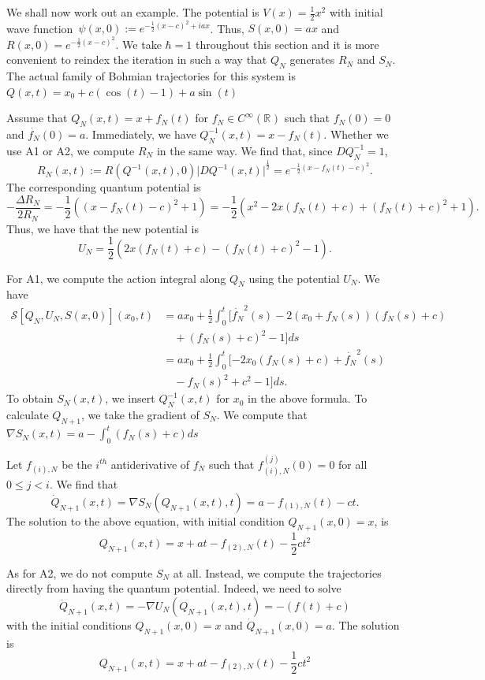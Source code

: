 \documentclass[11pt]{article}
\theoremstyle{remark}
\begin{document}
We shall now work out an  example. 
The potential is $V(x) = \frac{1}{2}x^2$ with initial wave function\
$\ensuremath{\psi} (x,0) \ensuremath{:=} e^{-\frac{1}{2}(x-c)^2+iax}$. Thus, $S(x,0) = ax$ and $R(x,0)
= e^{-\frac{1}{2}(x-c)^2}$. We take $\hbar =1$ throughout this section
and it is more convenient to reindex the iteration  in such a way  that $Q_N$
generates $R_N$ and $S_N$. The actual family of Bohmian trajectories for this
system is  $Q(x,t) = x_0 + c(\cos(t)-1) + a \sin(t) $


Assume that $Q_N(x,t) = x + f_N(t)$ for $f_N \in \ensuremath{C^{\infty}}(\ensuremath{\mathbb{R}^{}})$ such that
$f_N(0) =0$ and $\dot{f_N}(0) = a$. Immediately, we have $Q^{-1}_N (x,t) =
x -f_N(t)$.    
Whether we use A1 or A2, we compute $R_N$ in the same way. We find
that, since $DQ_N^{-1} = 1$,
\[
R_N(x,t) \ensuremath{:=} R(Q^{-1}(x,t), 0) \ensuremath{\lvert {DQ^{-1} (x,t)} \rvert}^{\frac{1}{2}}
= e^{-\frac{1}{2}(x -f_N(t) -c)^2}.
\] The corresponding
quantum potential is 
\[ - \frac{\ensuremath{\Delta} R_N}{2R_N} =
-\frac{1}{2}((x-f_N(t)-c)^2 + 1) =
-\frac{1}{2} (x^2 -2x(f_N(t)+c)
+(f_N(t)+c)^2 +1) .\] 
Thus, we have that the new potential is \[
U_N 
= \frac{1}{2}(2x(f_N(t)+c) - (f_N(t)+c)^2 -1).
\]

For A1, we compute the action integral along $Q_N$ using the potential
$U_N$. 
 We have 
\[
\begin{split} \ensuremath{\mathcal{S}}[Q_N, U_N, S(x,0)](x_0,t)
& = ax_0 + \frac{1}{2}\int_0^t [\dot{f_N}^2(s) - 
  2(x_0+f_N(s))(f_N(s)+c) \\&\quad+ (f_N(s)+c)^2 -1 ]ds \\
& = ax_0 + \frac{1}{2}\int_0^t [-2x_0(f_N(s)+c) + 
 \dot{f_N}^2(s) \\&\quad- f_N(s)^2 +c^2 -1]ds .
\end{split}
\]
To obtain $S_N(x, t)$, we insert $Q_N^{-1}(x,t)$ for $x_0$
in the above formula. To calculate $Q_{N+1}$, we take the gradient of
$S_N$. We compute that  $\nabla S_N(x,t) = a -\int_0^t (f_N(s)+c) ds $


Let $f_{(i), N}$ be the \ensuremath{{i}^{th}} 
antiderivative of $f_N$ such that $f_{(i),N}^{(j)}(0)= 0$ for all $0 \leq j
< i$. 
 We find that
\[
\dot{Q}_{N+1} (x,t) = \nabla S_N (Q_{N+1}(x,t),t) = a - f_{(1),N}(t) - ct .
\] 
The solution to the above equation, with initial condition $Q_{N+1}(x,0) =
x$, is 
\[
Q_{N+1} (x, t) = x+ a t - f_{(2),N}(t) - \frac{1}{2} ct^2  
\] 


As for A2, we do not compute $S_N$ at all. Instead, we compute the
trajectories directly from having the quantum potential.
Indeed, we need to solve
\[
\ddot{Q}_{N+1} (x,t) = -\nabla U_N (Q_{N+1}(x,t), t)
= -(f(t) + c)
\]
with the initial conditions $Q_{N+1}(x,0)= x$ and $\dot{Q}_{N+1}(x,0)
= a$. The solution is 
\[
Q_{N+1} (x,t) = x+ a t - f_{(2),N}(t) - \frac{1}{2} ct^2  
\]
\end{document}
